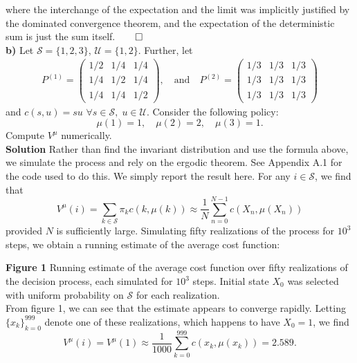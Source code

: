 \documentclass[11pt, letterpaper]{article}
\newcommand{\mc}[1]{\mathcal{#1}}
\begin{document}
    where the interchange of the expectation and the limit was implicitly justified by the dominated convergence theorem, and the expectation of the deterministic sum is just the sum itself.\hfill{$\qed$}\\[10pt]
    {\bf b)} Let $\mc{S}=\{1,2,3\}$, $\mc{U}=\{1,2\}$. Further, let
    \begin{align*}
        P^{(1)}=\begin{pmatrix}
            1/2 & 1/4 & 1/4\\
            1/4 & 1/2 & 1/4\\
            1/4 & 1/4 & 1/2
        \end{pmatrix},\quad\text{and}\quad P^{(2)}=\begin{pmatrix}
            1/3 & 1/3 & 1/3 \\
            1/3 & 1/3 & 1/3\\
            1/3 & 1/3 & 1/3
        \end{pmatrix}
    \end{align*}
    and $c(s,u)=su$ $\forall s\in\mc{S},\;u\in\mc{U}$. Consider the following policy:
    \[\mu(1)=1,\quad\mu(2)=2,\quad\mu(3)=1.\]
    Compute $V^\mu$ numerically.\\[10pt]
    {\bf Solution} Rather than find the invariant distribution and use the formula above, we simulate the process and rely on the ergodic theorem. See Appendix A.1 for the code used to do this.
    We simply report the result here. For any $i\in\mc{S}$, we find that
    \[V^\mu(i)=\sum_{k\in\mc{S}}\pi_kc(k,\mu(k))\approx\frac{1}{N}\sum_{n=0}^{N-1}c(X_n,\mu(X_n))\]
    provided $N$ is sufficiently large. Simulating fifty realizations of the process for $10^3$ steps, we obtain a running estimate of the average cost function:
    \begin{center}
    \end{center}
    {\bf Figure 1} Running estimate of the average cost function over fifty realizations of the decision process, each simulated for $10^3$ steps. Initial state $X_0$ was selected with uniform probability on $\mc{S}$ for each realization.\\[10pt]
    From figure 1, we can see that the estimate appears to converge rapidly. Letting $\{x_k\}_{k=0}^{999}$ denote one of these realizations, which happens to have $X_0=1$, we find
    \[V^\mu(i)=V^\mu(1)\approx \frac{1}{1000}\sum_{k=0}^{999}c(x_k, \mu(x_k))=2.589.\tag*{$\qed$}\]
    \\[10pt]
\end{document}
